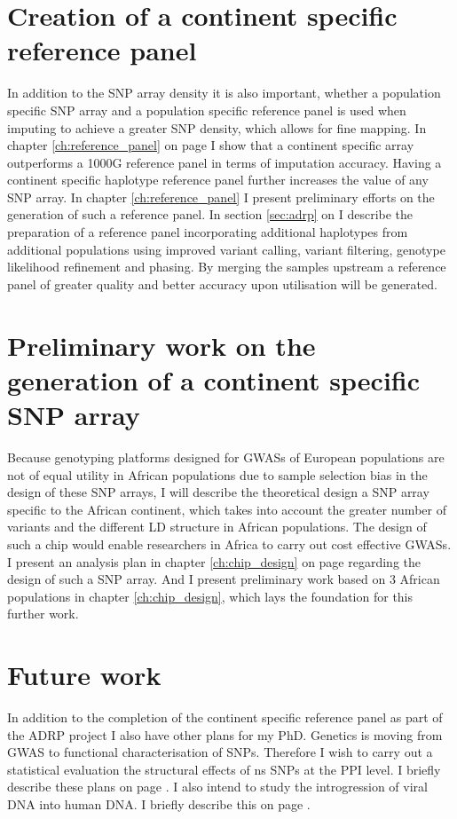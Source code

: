 \section{Creation of a continent specific reference panel}
In addition to the \gls{SNP} array density it is also important, whether a population specific \gls{SNP} array and a population specific reference panel is used when imputing to achieve a greater SNP density, which allows for fine mapping. In chapter \ref{ch:reference_panel} on page \pageref{ch:reference_panel} I show that a continent specific array outperforms a 1000G reference panel in terms of imputation accuracy. Having a continent specific haplotype reference panel further increases the value of any SNP array. In chapter \ref{ch:reference_panel} I present preliminary efforts on the generation of such a reference panel. In section \ref{sec:adrp} on \pageref{sec:adrp} I describe the preparation of a reference panel incorporating additional haplotypes from additional populations using improved variant calling, variant filtering, genotype likelihood refinement and phasing. By merging the samples upstream a reference panel of greater quality and better accuracy upon utilisation will be generated.

\section{Preliminary work on the generation of a continent specific SNP array}
Because genotyping platforms designed for \glspl{GWAS} of European populations are not of equal utility in African populations due to sample selection bias in the design of these \gls{SNP} arrays, I will describe the theoretical design a \gls{SNP} array specific to the African continent, which takes into account the greater number of variants and the different \gls{LD} structure in African populations. The design of such a chip would enable researchers in Africa to carry out cost effective \glspl{GWAS}. I present an analysis plan in chapter \ref{ch:chip_design} on page \pageref{ch:chip_design} regarding the design of such a \gls{SNP} array. And I present preliminary work based on 3 African populations in chapter \ref{ch:chip_design}, which lays the foundation for this further work.

\section{Future work}
In addition to the completion of the continent specific reference panel as part of the \gls{ADRP} project I also have other plans for my PhD. Genetics is moving from \gls{GWAS} to functional characterisation of \glspl{SNP}. Therefore I wish to carry out a statistical evaluation the structural effects of \gls{ns} \glspl{SNP} at the \gls{PPI} level. I briefly describe these plans on page \pageref{ch:future}. I also intend to study the introgression of viral \gls{DNA} into human \gls{DNA}. I briefly describe this on page \pageref{ch:future}.

